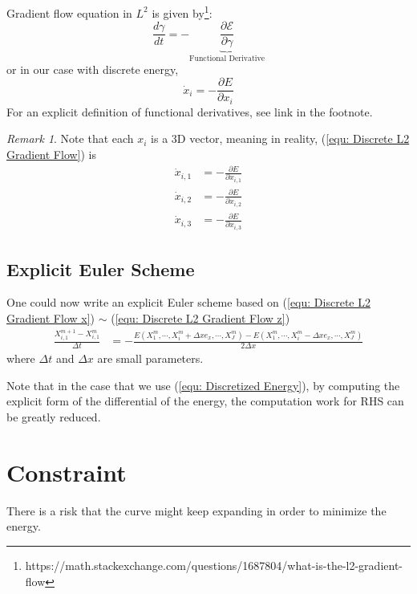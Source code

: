 \documentclass[a4paper, 11pt]{article}
\theoremstyle{definition}
\theoremstyle{remark}
\newtheorem{remark}{Remark}
\begin{document}
Gradient flow equation in $L^2$ is given by\footnote{
    https://math.stackexchange.com/questions/1687804/what-is-the-l2-gradient-flow
}:
\begin{equation}
    \frac{d \gamma}{dt} = - \underbrace{\frac{\partial \mathcal{E}}{\partial \gamma}}_{\text{Functional Derivative}}
\end{equation}
or in our case with discrete energy,
\begin{equation}
    \dot{x}_i = - \frac{\partial E}{\partial x_i}
    \label{equ: Discrete L2 Gradient Flow}
\end{equation}
For an explicit definition of functional derivatives, see link in the footnote.

\begin{remark}
    Note that each $x_i$ is a 3D vector,
    meaning in reality, (\ref{equ: Discrete L2 Gradient Flow}) is
    \begin{align}
        \dot{x}_{i, 1} &= -\frac{\partial E}{\partial x_{i, 1}}
        \label{equ: Discrete L2 Gradient Flow x}
        \\
        \dot{x}_{i, 2} &= -\frac{\partial E}{\partial x_{i, 2}} 
        \label{equ: Discrete L2 Gradient Flow y}
        \\
        \dot{x}_{i, 3} &= -\frac{\partial E}{\partial x_{i, 3}}
        \label{equ: Discrete L2 Gradient Flow z}
    \end{align}
\end{remark}

\subsection{Explicit Euler Scheme}
One could now write an explicit Euler scheme based on (\ref{equ: Discrete L2 Gradient Flow x}) $\sim$ (\ref{equ: Discrete L2 Gradient Flow z})
\begin{align}
    \frac{X_{i,1}^{m+1} - X_{i,1}^{m}}{\Delta t} &=  - \frac{E\left( X_1^{m}, \cdots, X_i^m + \Delta x e_x, \cdots, X_J^m \right) - E\left( X_1^{m}, \cdots, X_i^m - \Delta x e_x, \cdots, X_J^m \right)}{2 \Delta x}
    \label{equ: Discrete L2 Gradient Flow x Explicit Scheme}
\end{align}
where $\Delta t$ and $\Delta x$ are small parameters.

Note that in the case that we use (\ref{equ: Discretized Energy}),
by computing the explicit form of the differential of the energy,
the computation work for RHS can be greatly reduced.

\section{Constraint}
There is a risk that the curve might keep expanding in order to minimize the energy.
\end{document}
